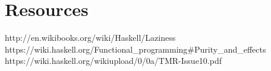 \documentclass[journal]{IEEEtran}
\begin{document}
\section*{Resources}

http://en.wikibooks.org/wiki/Haskell/Laziness\\
https://wiki.haskell.org/Functional\_programming\#Purity\_and\_effects\\
https://wiki.haskell.org/wikiupload/0/0a/TMR-Issue10.pdf

\ifCLASSOPTIONcaptionsoff
  \newpage
\fi





%
%
%


% 








\end{document}
